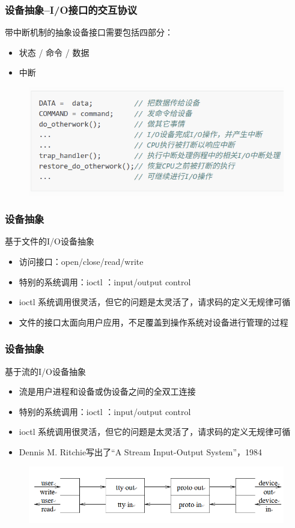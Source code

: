 \begin{frame}[fragile]
    \frametitle{设备抽象--I/O接口的交互协议}
    带中断机制的抽象设备接口需要包括四部分：
    \begin{itemize}
        \item 状态 / 命令 / 数据
        \item 中断
    \end{itemize}
    \begin{figure}
        \includegraphics[width=0.7\linewidth]{figs/intr-io-interface.png}
    \end{figure}
\end{frame}

\begin{frame}[fragile]
    \frametitle{设备抽象}
    基于文件的I/O设备抽象
    \begin{itemize}
        \item 访问接口：open/close/read/write
        \item 特别的系统调用：ioctl ：input/output control
        \item ioctl 系统调用很灵活，但它的问题是太灵活了，请求码的定义无规律可循
        \item 文件的接口太面向用户应用，不足覆盖到操作系统对设备进行管理的过程
    \end{itemize}

\end{frame}

\begin{frame}[fragile]
    \frametitle{设备抽象}
    基于流的I/O设备抽象
    \begin{itemize}
        \item 流是用户进程和设备或伪设备之间的全双工连接
        \item 特别的系统调用：ioctl ：input/output control
        \item ioctl 系统调用很灵活，但它的问题是太灵活了，请求码的定义无规律可循
        \item Dennis M. Ritchie写出了“A Stream Input-Output System”，1984
    \end{itemize}
        \begin{figure}
        \includegraphics[width=0.7\linewidth]{figs/stream.png}
    \end{figure}
\end{frame}

